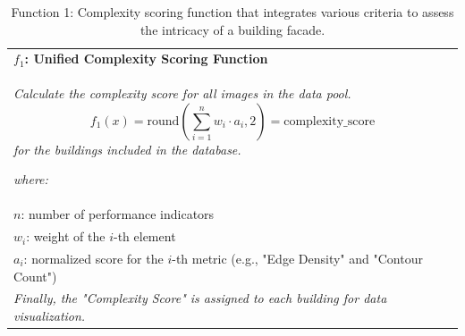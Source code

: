 \documentclass[final,5p,times]{elsarticle}
\begin{document}
\begin{table}[htb]
    \caption{Function 1: Complexity scoring function that integrates various criteria to assess the intricacy of a building facade.}
    \label{tab:ComplexityScoreFunction}
    \begin{tabular}{|p{\linewidth}|}
        \hline
        \small
        \vspace{0.5em}
        \textbf{\(f_1\): Unified Complexity Scoring Function}\\
        \textit{Calculate the complexity score for all images in the data pool.}
        \begin{equation}
            f_1(x) = \mathrm{round}\left(\sum_{i=1}^{n} w_i \cdot a_i, 2\right) = \text{complexity\_score}
            \label{eq:F1_ComplexityScoreFunction}
        \end{equation}
        \textit{for the buildings included in the database.}
        \vspace{0.5em}

        \textit{where:}\\
        \(n\): number of performance indicators\\
        \(w_i\): weight of the \(i\)-th element\\
        \(a_i\): normalized score for the \(i\)-th metric (e.g., "Edge Density" and "Contour Count")\\
        \textit{Finally, the "Complexity Score" is assigned to each building for data visualization.}
        \vspace{0.5em}\\
        \hline
    \end{tabular}
\end{table}
\end{document}
